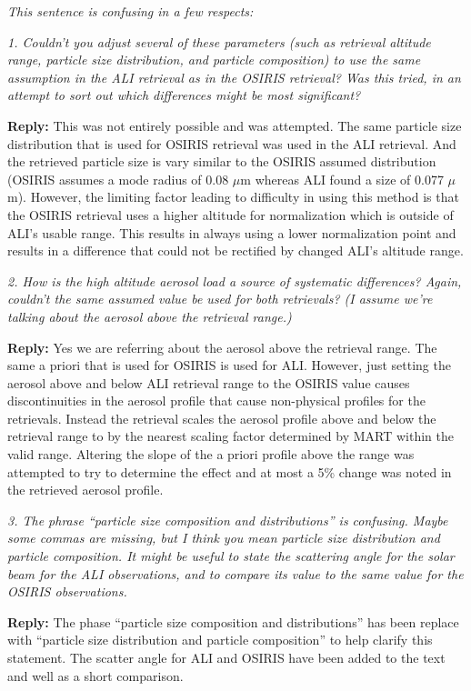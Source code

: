 \documentclass[12pt, notitlepage]{article}
\begin{document}
\textit{This sentence is confusing in a few respects:}

\textit{1. Couldn't you adjust several of these parameters (such as retrieval altitude range,
particle size distribution, and particle composition) to use the same assumption in the
ALI retrieval as in the OSIRIS retrieval? Was this tried, in an attempt to sort out which
differences might be most significant?}

\textbf{Reply:} This was not entirely possible and was attempted. The same particle size distribution
that is used for OSIRIS retrieval was used in the ALI retrieval. And the retrieved particle size is vary
similar to the OSIRIS assumed distribution (OSIRIS assumes a mode radius of 0.08 $\mu$m whereas ALI found a size of 0.077 $\mu$m).  However, the limiting factor leading to difficulty
in using this method is that the OSIRIS retrieval uses a higher altitude for normalization which
is outside of ALI's usable range. This results in always using a lower normalization point and results in a difference
that could not be rectified by changed ALI's altitude range.

\textit{2. How is the high altitude aerosol load a source of systematic differences? Again,
couldn't the same assumed value be used for both retrievals? (I assume we're talking
about the aerosol above the retrieval range.)}

\textbf{Reply:} Yes we are referring about the aerosol above the retrieval range. The same a priori that is used for OSIRIS is used for ALI. However, just setting the aerosol above and below ALI retrieval range to the OSIRIS value causes discontinuities in the aerosol profile that cause non-physical profiles for the retrievals. Instead the retrieval scales the aerosol profile above and below the retrieval range to by the nearest scaling factor determined by MART within the valid range. Altering the slope of the a priori profile above the range was attempted to try to determine the effect and at most a 5\% change was noted in the retrieved aerosol profile.

\textit{3. The phrase ``particle size composition and distributions'' is confusing. Maybe some
commas are missing, but I think you mean particle size distribution and particle composition.
It might be useful to state the scattering angle for the solar beam for the ALI observations,
and to compare its value to the same value for the OSIRIS observations.}

\textbf{Reply:} The phase ``particle size composition and distributions'' has been replace with ``particle size distribution and particle composition'' to help clarify this statement. The scatter angle for ALI and OSIRIS have been added to the text and well as a short comparison.
\hrulefill
\end{document}
